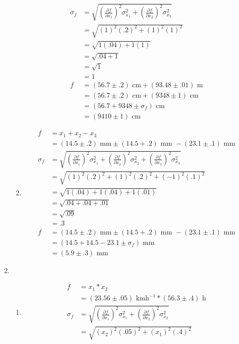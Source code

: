 \documentclass{article}
\begin{document}
\begin{enumerate}
\begin{enumerate}
\begin{align*}
\sigma_{f} &= \sqrt{(\frac{\partial f}{\partial x_{1}})^2\sigma_{x_{1}}^2 + (\frac{\partial f}{\partial x_{2}})^2\sigma_{x_{2}}^2}\\
&= \sqrt{(1)^2(.2)^2 + (1)^2(1)^2}\\
&= \sqrt{1(.04) + 1(1)}\\
&= \sqrt{.04 + 1}\\
&= \sqrt{1}\\
&= 1\\
f &= (56.7 \pm .2)\text{ cm} + (93.48 \pm .01)\text{ m}\\
&= (56.7 \pm .2)\text{ cm} + (9348 \pm 1)\text{ cm}\\
&= (56.7 + 9348 \pm \sigma_{f})\text{ cm}\\
&= (9410 \pm 1)\text{ cm}
\end{align*}
\item
\begin{align*}
f &= x_{1} + x_{2} - x_{3}\\
&= (14.5 \pm .2)\text{ mm} \pm (14.5 + .2)\text{ mm } - (23.1 \pm .1)\text{ mm}\\
\sigma_{f} &= \sqrt{(\frac{\partial f}{\partial x_{1}})^2\sigma_{x_{1}}^2 + (\frac{\partial f}{\partial x_{2}})^2\sigma_{x_{2}}^2 + (\frac{\partial f}{\partial x_{3}})^2\sigma_{x_{3}}^2}\\
&= \sqrt{(1)^2(.2)^2 + (1)^2(.2)^2 + (-1)^2(.1)^2}\\
&= \sqrt{1(.04) + 1(.04) + 1(.01)}\\
&= \sqrt{.04 + .04 + .01}\\
&= \sqrt{.09}\\
&= .3\\
f &= (14.5 \pm .2)\text{ mm} \pm (14.5 + .2)\text{ mm } - (23.1 \pm .1)\text{ mm}\\
&= (14.5 + 14.5 - 23.1 \pm \sigma_{f})\text{ mm}\\
&= (5.9 \pm .3)\text{ mm}
\end{align*}
\end{enumerate}
\item
\begin{enumerate}
\item
\begin{align*}
f &= x_{1} * x_{2}\\
&= (23.56 \pm .05)\text{ kmh}^{-1} * (56.3 \pm .4)\text{ h}\\
\sigma_{f} &= \sqrt{(\frac{\partial f}{\partial x_{1}})^2\sigma_{x_{1}}^2 + (\frac{\partial f}{\partial x_{2}})^2\sigma_{x_{2}}^2}\\
&= \sqrt{(x_{2})^2(.05)^2 + (x_{1})^2(.4)^2}\\

\end{align*}
\end{enumerate}
\end{enumerate}
\end{document}
